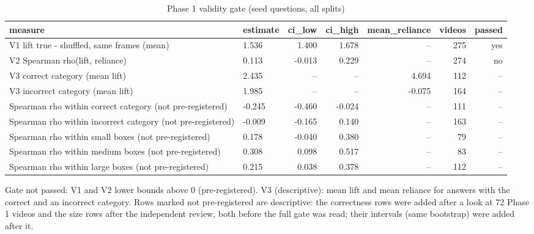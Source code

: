 \begin{table}[htbp]
\centering
\scriptsize
\caption{Phase 1 validity gate (seed questions, all splits)}\label{tab:R2}
\begin{adjustbox}{max width=\textwidth}
\begin{tabular}{llrrrrr}
\toprule
measure & estimate & ci\_\allowbreak{}low & ci\_\allowbreak{}high & mean\_\allowbreak{}reliance & videos & passed \\
\midrule
V1 lift true - shuffled, same frames (mean) & 1.536 & 1.400 & 1.678 & -- & 275 & yes \\
V2 Spearman rho(lift, reliance) & 0.113 & -0.013 & 0.229 & -- & 274 & no \\
V3 correct category (mean lift) & 2.435 & -- & -- & 4.694 & 112 & -- \\
V3 incorrect category (mean lift) & 1.985 & -- & -- & -0.075 & 164 & -- \\
Spearman rho within correct category (not pre-registered) & -0.245 & -0.460 & -0.024 & -- & 111 & -- \\
Spearman rho within incorrect category (not pre-registered) & -0.009 & -0.165 & 0.140 & -- & 163 & -- \\
Spearman rho within small boxes (not pre-registered) & 0.178 & -0.040 & 0.380 & -- & 79 & -- \\
Spearman rho within medium boxes (not pre-registered) & 0.308 & 0.098 & 0.517 & -- & 83 & -- \\
Spearman rho within large boxes (not pre-registered) & 0.215 & 0.038 & 0.378 & -- & 112 & -- \\
\bottomrule
\end{tabular}
\end{adjustbox}
\par\smallskip\parbox{\textwidth}{\footnotesize Gate not passed: V1 and V2 lower bounds above 0 (pre-registered). V3 (descriptive): mean lift and mean reliance for answers with the correct and an incorrect category. Rows marked not pre-registered are descriptive: the correctness rows were added after a look at 72 Phase 1 videos and the size rows after the independent review, both before the full gate was read; their intervals (same bootstrap) were added after it.}
\end{table}
